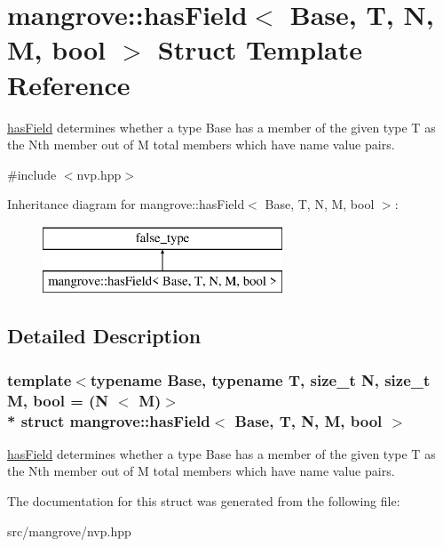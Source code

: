 \hypertarget{structmangrove_1_1hasField}{}\section{mangrove\+:\+:has\+Field$<$ Base, T, N, M, bool $>$ Struct Template Reference}
\label{structmangrove_1_1hasField}


\hyperlink{structmangrove_1_1hasField}{has\+Field} determines whether a type Base has a member of the given type T as the Nth member out of M total members which have name value pairs.  




{\ttfamily \#include $<$nvp.\+hpp$>$}

Inheritance diagram for mangrove\+:\+:has\+Field$<$ Base, T, N, M, bool $>$\+:\begin{figure}[H]
\begin{center}
\leavevmode
\includegraphics[height=2.000000cm]{structmangrove_1_1hasField}
\end{center}
\end{figure}


\subsection{Detailed Description}
\subsubsection*{template$<$typename Base, typename T, size\+\_\+t N, size\+\_\+t M, bool = (\+N $<$ M)$>$\\*
struct mangrove\+::has\+Field$<$ Base, T, N, M, bool $>$}

\hyperlink{structmangrove_1_1hasField}{has\+Field} determines whether a type Base has a member of the given type T as the Nth member out of M total members which have name value pairs. 

The documentation for this struct was generated from the following file\+:\begin{DoxyCompactItemize}
\item 
src/mangrove/nvp.\+hpp\end{DoxyCompactItemize}
